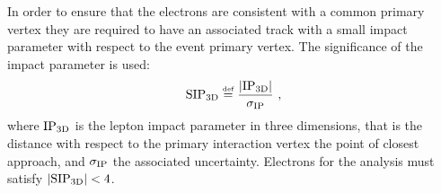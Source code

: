 In order to ensure that the electrons are consistent with a common primary vertex
they are required to have an associated track with a small impact parameter with respect to the event primary vertex.
The significance of the impact parameter is used:
\begin{equation}
\label{eq:SIP3D}
\SIPthreeD \mathdefined \frac{|\rm IP_{3D}|}{\sigma_{\rm IP}} \ ,
\end{equation}
where ${\rm IP_{3D}}$ is the lepton impact parameter in three dimensions,
that is the distance with respect to the primary interaction vertex the point of closest approach,
and $\sigma_{\rm IP}$ the associated uncertainty.
Electrons for the analysis must satisfy $|\mathrm{SIP}_{\mathrm{3D}}| < 4$.
